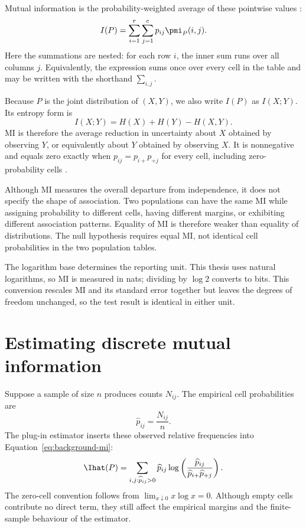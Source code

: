 Mutual information is the probability-weighted average of these pointwise
values \citep{shannon1948,bossomaier2016}:
\begin{equation}
  I(P)
  =\sum_{i=1}^{r}\sum_{j=1}^{c}p_{ij}\pmi_P(i,j).
  \label{eq:background-mi}
\end{equation}
Here the summations are nested: for each row \(i\), the inner sum runs over
all columns \(j\). Equivalently, the expression sums once over every cell in
the table and may be written with the shorthand \(\sum_{i,j}\).

Because \(P\) is the joint distribution of \((X,Y)\), we also write
\(I(P)\) as \(I(X;Y)\). Its entropy form is
\begin{equation}
  I(X;Y)=H(X)+H(Y)-H(X,Y).
  \label{eq:mi-entropy-form}
\end{equation}
MI is therefore the average reduction in uncertainty about \(X\) obtained
by observing \(Y\), or equivalently about \(Y\) obtained by observing \(X\).
It is nonnegative and equals zero exactly when
\(p_{ij}=p_{i+}p_{+j}\) for every cell, including zero-probability cells
\citep{bossomaier2016}.

Although MI measures the overall departure from independence, it does not
specify the shape of association. Two populations can have the same MI while assigning
probability to different cells, having different margins, or exhibiting
different association patterns. Equality of MI is therefore weaker than
equality of distributions. The null hypothesis requires equal MI, not
identical cell probabilities in the two population tables.

The logarithm base determines the reporting unit. This thesis uses natural
logarithms, so MI is measured in nats; dividing by \(\log 2\) converts to bits.
This conversion rescales MI and its standard error together but leaves the
degrees of freedom unchanged, so the test result is identical in either unit.

\section{Estimating discrete mutual information}
\label{sec:background-mi-bias}

Suppose a sample of size \(n\) produces counts \(N_{ij}\). The empirical cell
probabilities are
\begin{equation}
  \widehat p_{ij}=\frac{N_{ij}}{n}.
\end{equation}
The plug-in estimator inserts these observed relative frequencies into
Equation~\eqref{eq:background-mi}:
\begin{equation}
  \Ihat(P)
  =\sum_{i,j:\widehat p_{ij}>0}
  \widehat p_{ij}
  \log\left(
  \frac{\widehat p_{ij}}
       {\widehat p_{i+}\widehat p_{+j}}
  \right).
  \label{eq:plugin-mi-background}
\end{equation}
The zero-cell convention follows from
\(\lim_{x\downarrow0}x\log x=0\). Although empty cells contribute no
direct term, they still affect the empirical margins and the finite-sample
behaviour of the estimator.

